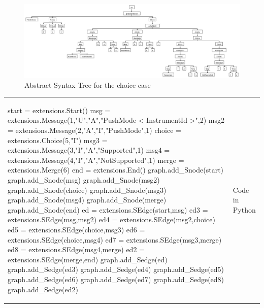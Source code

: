 \documentclass[a4paper,11pt,twoside]{report}
\begin{document}
\begin{figure}[h]
\begin{center}
\includegraphics[width=18cm]{choiceAST}\caption{Abstract Syntax Tree for the choice case}
\end{center}
\label{fig:ChoiceAST}
\end{figure}
\begin{tabular}{ll}
\begin{SJLISTING}
start = extensions.Start()
msg = extensions.Message(1,"U","A","PushMode < InstrumentId >",2)
msg2 = extensions.Message(2,"A","I","PushMode",1)
choice = extensions.Choice(5,"I")
msg3 = extensions.Message(3,"I","A","Supported",1)
msg4 = extensions.Message(4,"I","A","NotSupported",1)
merge = extensions.Merge(6)
end = extensions.End()
graph.add_Snode(start)
graph.add_Snode(msg)
graph.add_Snode(msg2)
graph.add_Snode(choice)
graph.add_Snode(msg3)
graph.add_Snode(msg4)
graph.add_Snode(merge)
graph.add_Snode(end)
ed = extensions.SEdge(start,msg)
ed3 = extensions.SEdge(msg,msg2)
ed4 = extensions.SEdge(msg2,choice)
ed5 = extensions.SEdge(choice,msg3)
ed6 = extensions.SEdge(choice,msg4)
ed7 = extensions.SEdge(msg3,merge)
ed8 = extensions.SEdge(msg4,merge)
ed2 = extensions.SEdge(merge,end)
graph.add_Sedge(ed)
graph.add_Sedge(ed3)
graph.add_Sedge(ed4)
graph.add_Sedge(ed5)
graph.add_Sedge(ed6)
graph.add_Sedge(ed7)
graph.add_Sedge(ed8)
graph.add_Sedge(ed2)
\end{SJLISTING}
&  Code in Python
\end{tabular}
\end{document}
